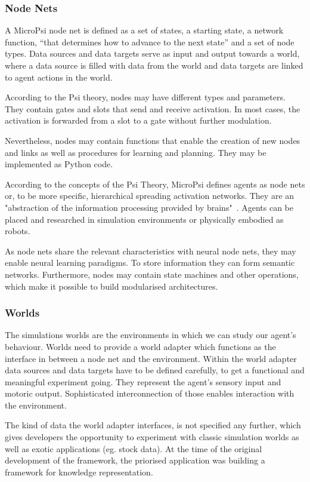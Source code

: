         \subsubsection{Node Nets}
A MicroPsi node net is defined as a set of states, a starting state, a network function, ``that determines how to advance to the next state'' and a set of node types. Data sources and data targets serve as input and output towards a world, where a data source is filled with data from the world and data targets are linked to agent actions in the world.

According to the Psi theory, nodes may have different types and parameters. They contain gates and slots that send and receive activation. In most cases, the activation is forwarded from a slot to a gate without further modulation.

Nevertheless, nodes may contain functions that enable the creation of new nodes and links as well as procedures for learning and planning. They may be implemented as Python code.

According to the concepts of the Psi Theory, MicroPsi defines agents as node nets or, to be more specific, hierarchical spreading activation networks. They are an "abstraction of the information processing provided by brains"~\cite{conf/agi/Bach12}. Agents can be placed and researched in simulation environments or physically embodied as robots.

As node nets share the relevant characteristics with neural node nets, they may enable neural learning paradigms. To store information they can form semantic networks. Furthermore, nodes may contain state machines and other operations, which make it possible to build modularised architectures.

        \subsubsection{Worlds}
The simulations worlds are the environments in which we can study our agent's behaviour. Worlds need to provide a world adapter which functions as the interface in between a node net and the environment. Within the world adapter data sources and data targets have to be defined carefully, to get a functional and meaningful experiment going. They represent the agent's sensory input and motoric output. Sophisticated interconnection of those enables interaction with the environment.

The kind of data the world adapter interfaces, is not specified any further, which gives developers the opportunity to experiment with classic simulation worlds as well as exotic applications (eg. stock data). At the time of the original development of the framework, the priorised application was building a framework for knowledge representation.

